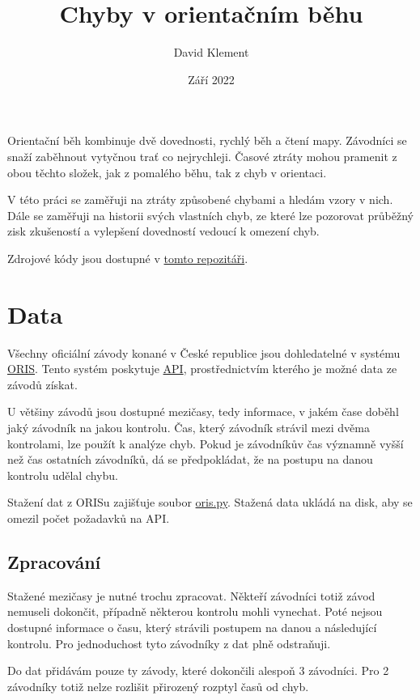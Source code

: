 \documentclass[a4paper,11pt]{article}
\title{\Huge Chyby v orientačním běhu}
\author{David Klement}
\date{Září 2022}
\begin{document}
\maketitle
\thispagestyle{empty}
\pagebreak

Orientační běh kombinuje dvě dovednosti, rychlý běh a čtení mapy. Závodníci se
snaží zaběhnout vytyčnou trať co nejrychleji. Časové ztráty mohou pramenit z
obou těchto složek, jak z pomalého běhu, tak z chyb v orientaci.

V této práci se zaměřuji na ztráty způsobené chybami a hledám vzory v nich. Dále
se zaměřuji na historii svých vlastních chyb, ze které lze pozorovat průběžný
zisk zkušeností a vylepšení dovedností vedoucí k omezení chyb.

Zdrojové kódy jsou dostupné v
\href{https://github.com/kulisak12/mistake-stats}{tomto repozitáři}.

\section*{Data}

Všechny oficiální závody konané v České republice jsou dohledatelné v systému
\href{https://oris.orientacnisporty.cz/?sport=1}{ORIS}. Tento systém poskytuje
\href{https://oris.orientacnisporty.cz/API}{API}, prostřednictvím kterého je možné
data ze závodů získat.

U většiny závodů jsou dostupné mezičasy, tedy informace, v jakém čase doběhl
jaký závodník na jakou kontrolu. Čas, který závodník strávil mezi dvěma
kontrolami, lze použít k analýze chyb. Pokud je závodníkův čas významně vyšší
než čas ostatních závodníků, dá se předpokládat, že na postupu na danou kontrolu
udělal chybu.

Stažení dat z ORISu zajišťuje soubor
\href{https://github.com/kulisak12/mistake-stats/blob/main/oris.py}{oris.py}.
Stažená data ukládá na disk, aby se omezil počet požadavků na API.

\subsection*{Zpracování}

Stažené mezičasy je nutné trochu zpracovat. Někteří závodníci totiž závod
nemuseli dokončit, případně některou kontrolu mohli vynechat. Poté nejsou
dostupné informace o času, který strávili postupem na danou a následující
kontrolu. Pro jednoduchost tyto závodníky z dat plně odstraňuji.

Do dat přidávám pouze ty závody, které dokončili alespoň 3 závodníci. Pro 2
závodníky totiž nelze rozlišit přirozený rozptyl časů od chyb.
\end{document}

